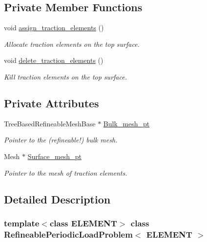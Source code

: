 \subsection*{Private Member Functions}
\begin{DoxyCompactItemize}
\item 
void \hyperlink{classRefineablePeriodicLoadProblem_a0de046a3d8a5d88f01d782fdc1be82a0}{assign\+\_\+traction\+\_\+elements} ()
\begin{DoxyCompactList}\small\item\em Allocate traction elements on the top surface. \end{DoxyCompactList}\item 
void \hyperlink{classRefineablePeriodicLoadProblem_a491998bff6616edaa5e29bf155d0284b}{delete\+\_\+traction\+\_\+elements} ()
\begin{DoxyCompactList}\small\item\em Kill traction elements on the top surface. \end{DoxyCompactList}\end{DoxyCompactItemize}
\subsection*{Private Attributes}
\begin{DoxyCompactItemize}
\item 
Tree\+Based\+Refineable\+Mesh\+Base $\ast$ \hyperlink{classRefineablePeriodicLoadProblem_a98440a404cb3de29aad5a93f768889cd}{Bulk\+\_\+mesh\+\_\+pt}
\begin{DoxyCompactList}\small\item\em Pointer to the (refineable!) bulk mesh. \end{DoxyCompactList}\item 
Mesh $\ast$ \hyperlink{classRefineablePeriodicLoadProblem_a760d47dad3385febb9bd893afda424c2}{Surface\+\_\+mesh\+\_\+pt}
\begin{DoxyCompactList}\small\item\em Pointer to the mesh of traction elements. \end{DoxyCompactList}\end{DoxyCompactItemize}


\subsection{Detailed Description}
\subsubsection*{template$<$class E\+L\+E\+M\+E\+NT$>$\newline
class Refineable\+Periodic\+Load\+Problem$<$ E\+L\+E\+M\+E\+N\+T $>$}

